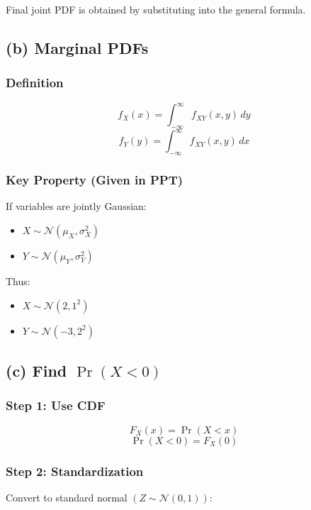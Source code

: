 \documentclass[12pt]{article}
\begin{document}
Final joint PDF is obtained by substituting into the general formula.

\subsection*{(b) Marginal PDFs}

\subsubsection*{Definition}

\[
f_X(x) = \int_{-\infty}^{\infty} f_{XY}(x,y)\,dy
\]
\[
f_Y(y) = \int_{-\infty}^{\infty} f_{XY}(x,y)\,dx
\]

\subsubsection*{Key Property (Given in PPT)}

If variables are jointly Gaussian:

\begin{itemize}
    \item $X \sim \mathcal{N}(\mu_X, \sigma_X^2)$
    \item $Y \sim \mathcal{N}(\mu_Y, \sigma_Y^2)$
\end{itemize}

Thus:

\begin{itemize}
    \item $X \sim \mathcal{N}(2,1^2)$
    \item $Y \sim \mathcal{N}(-3,2^2)$
\end{itemize}

\subsection*{(c) Find $\Pr(X < 0)$}

\subsubsection*{Step 1: Use CDF}

\[
F_X(x) = \Pr(X < x)
\]
\[
\Pr(X < 0) = F_X(0)
\]

\subsubsection*{Step 2: Standardization}

Convert to standard normal $(Z \sim \mathcal{N}(0,1))$:
\end{document}
